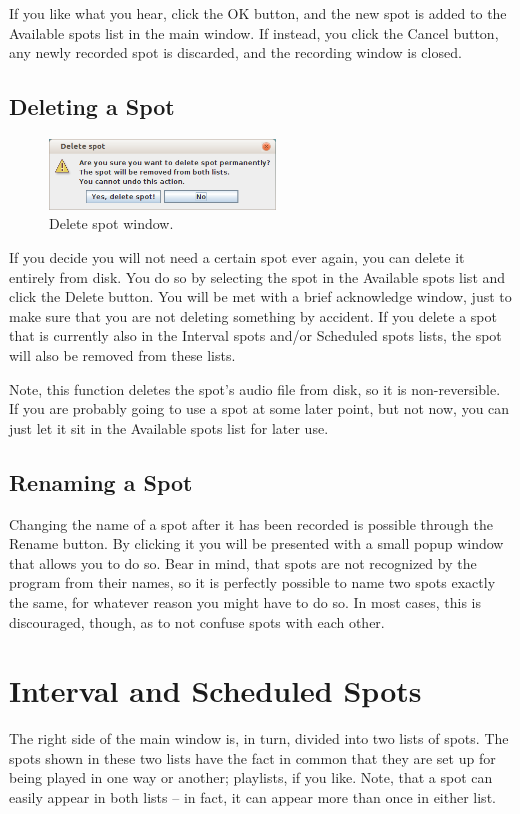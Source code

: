 \documentclass[a4paper,12pt]{report}
\begin{document}
If you like what you hear, click the OK button, and the new spot is added to the Available spots list in the main window. If instead, you click the Cancel button, any newly recorded spot is discarded, and the recording window is closed.

\subsection{Deleting a Spot}

\begin{figure}[h]
\centering \includegraphics[width=60mm]{deletespotdialogue.png}
\caption{Delete spot window.}
\end{figure}

If you decide you will not need a certain spot ever again, you can delete it entirely from disk. You do so by selecting the spot in the Available spots list and click the Delete button. You will be met with a brief acknowledge window, just to make sure that you are not deleting something by accident. If you delete a spot that is currently also in the Interval spots and/or Scheduled spots lists, the spot will also be removed from these lists.

Note, this function deletes the spot's audio file from disk, so it is non-reversible. If you are probably going to use a spot at some later point, but not now, you can just let it sit in the Available spots list for later use.

\subsection{Renaming a Spot}
Changing the name of a spot after it has been recorded is possible through the Rename button. By clicking it you will be presented with a small popup window that allows you to do so. Bear in mind, that spots are not recognized by the program from their names, so it is perfectly possible to name two spots exactly the same, for whatever reason you might have to do so. In most cases, this is discouraged, though, as to not confuse spots with each other.

\section{Interval and Scheduled Spots}
The right side of the main window is, in turn, divided into two lists of spots. The spots shown in these two lists have the fact in common that they are set up for being played in one way or another; playlists, if you like. Note, that a spot can easily appear in both lists -- in fact, it can appear more than once in either list.
\end{document}
